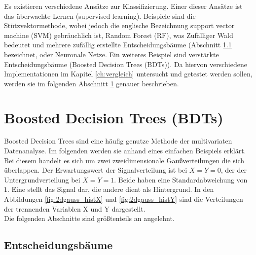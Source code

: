 Es existieren verschiedene Ans\"atze zur Klassifizierung. Einer dieser Ans\"atze ist das \"uberwachte Lernen (supervised learning). Beispiele sind die St\"utzvektormethode, wobei jedoch die englische Bezeichnung support vector machine (SVM) gebr\"auchlich ist, Random Forest (RF), was Zuf\"alliger Wald bedeutet und mehrere zuf\"allig erstellte Entscheidungsb\"aume (Abschnitt \ref{ch:Algorithmen:subsec:Entscheidungsbaum} bezeichnet, oder Neuronale Netze. Ein weiteres Beispiel sind verst\"arkte Entscheidungsb\"aume (Boosted Decision Trees (BDTs)). Da hiervon verschiedene Implementationen im Kapitel \ref{ch:vergleich} untersucht und getestet werden sollen, werden sie im folgenden Abschnitt \ref{ch:Algorithmen:sec:BDT} genauer beschrieben.

\section{Boosted Decision Trees (BDTs)}
\label{ch:Algorithmen:sec:BDT}

Boosted Decision Trees sind eine h\"aufig genutze Methode der multivariaten Datenanalyse. Im folgenden werden sie anhand eines einfachen Beispiels erkl\"art. Bei diesem handelt es sich um zwei zweidimensionale Gau\ss verteilungen die sich \"uberlappen. Der Erwartungswert der Signalverteilung ist bei $X=Y=0$, der der Untergrundverteilung bei $X=Y=1$. Beide haben eine Standardabweichung von $1$. Eine stellt das Signal dar, die andere dient als Hintergrund. In den Abbildungen \ref{fig:2dgauss_histX} und \ref{fig:2dgauss_histY} sind die Verteilungen der trennenden Variablen X und Y dargestellt.\\
Die folgenden Abschnitte sind gr\"o\ss tenteils an \cite{SWB-307748006} angelehnt.

\subsection{Entscheidungsb\"aume}
\label{ch:Algorithmen:subsec:Entscheidungsbaum}

